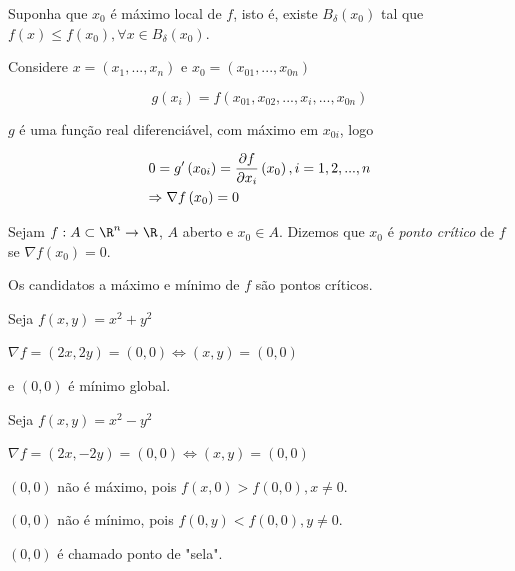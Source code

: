 \documentclass[11pt, oneside, a4paper]{gsm-l}
\begin{document}
\begin{dem}
    Suponha que $x_0$ é máximo local de $f$, isto é, existe $B_\delta  \left( {x_0 } \right)$ tal que $f\left( x \right) \leqslant f\left( {x_0 } \right),\forall x \in B_\delta  \left( {x_0 } \right)$.

    Considere $x = \left( {x_1 ,...,x_n } \right)$ e $x_0  = \left( {x_{01} ,...,x_{0n} } \right)$

\[
    g\left( {x_i } \right) = f\left( {x_{01} ,x_{02} ,...,x_i ,...,x_{0n} } \right)
\]

$g$ é uma função real diferenciável, com máximo em $x_{0i}$, logo

\[
\begin{gathered}
0 = g'\left( {x_{0i} } \right) = \frac{{\partial f}}
{{\partial x_i }}\left( {x_0 } \right),i = 1,2,...,n \hfill \\
\Rightarrow \nabla f\left( {x_0 } \right) = 0 \hfill \\
\end{gathered}
\]

\end{dem}

\begin{defi}
    Sejam $f:A \subset \R^n \to \R$, $A$ aberto e $x_0 \in A$. Dizemos que $x_0$ é \textit{ponto crítico} de $f$ se $\nabla f\left( {x_0 } \right) = 0$.

Os candidatos a máximo e mínimo de $f$ são pontos críticos.
\end{defi}

\begin{exem}
Seja $f\left( {x,y} \right) = x^2  + y^2$
\end{exem}

\begin{sol}
    $\nabla f = \left( {2x,2y} \right) = \left( {0,0} \right) \Leftrightarrow \left( {x,y} \right) = \left( {0,0} \right)$

e $\left( {0,0} \right)$ é mínimo global.
\end{sol}

\begin{exem}
Seja $f\left( {x,y} \right) = x^2  - y^2$
\end{exem}

\begin{sol}
    $\nabla f = \left( {2x, - 2y} \right) = \left( {0,0} \right) \Leftrightarrow \left( {x,y} \right) = \left( {0,0} \right)$

    $\left( {0,0} \right)$ não é máximo, pois $f\left( {x,0} \right) > f\left( {0,0} \right),x \ne 0$.

    $\left( {0,0} \right)$ não é mínimo, pois $f\left( {0,y} \right) < f\left( {0,0} \right),y \ne 0$.

$\left( {0,0} \right)$ é chamado ponto de "sela".
\end{sol}
\end{document}
